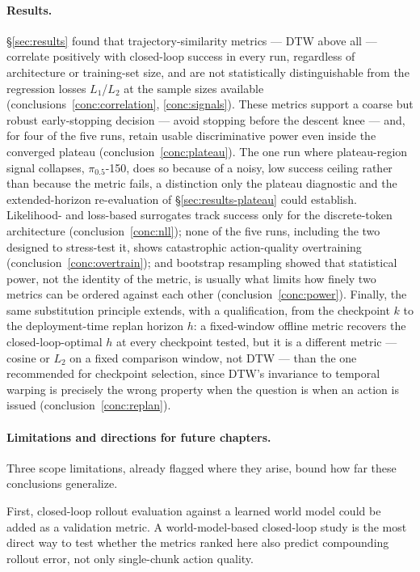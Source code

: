 \documentclass[english,12pt,a4paper,pdftex,elec,utf8]{aaltothesis}
\begin{document}
\paragraph{Results.} \S\ref{sec:results} found that trajectory-similarity metrics --- DTW above all --- correlate positively with closed-loop success in every run, regardless of architecture or training-set size, and are not statistically distinguishable from the regression losses $L_1$/$L_2$ at the sample sizes available (conclusions~\ref{conc:correlation}, \ref{conc:signals}). These metrics support a coarse
but robust early-stopping decision --- avoid stopping before the descent knee --- and, for four of the five runs, retain usable discriminative power even inside the converged plateau
(conclusion~\ref{conc:plateau}). The one run where plateau-region signal collapses, $\pi_{0.5}$-150, does so because of a noisy, low success ceiling rather than because the metric fails, a distinction only the plateau diagnostic and the extended-horizon re-evaluation of \S\ref{sec:results-plateau} could establish.
Likelihood- and loss-based surrogates track success only for the discrete-token architecture
(conclusion~\ref{conc:nll}); none of the five runs, including the two designed to stress-test it, shows catastrophic action-quality overtraining (conclusion~\ref{conc:overtrain}); and bootstrap resampling showed that statistical power, not the identity of the metric, is usually what limits how finely two metrics can be ordered against each other (conclusion~\ref{conc:power}). Finally, the same substitution principle extends, with a qualification, from the checkpoint $k$ to the deployment-time replan horizon $h$: a fixed-window offline metric recovers the closed-loop-optimal $h$ at every checkpoint tested, but it is a different metric --- cosine or $L_2$ on a fixed comparison window, not DTW --- than the one recommended for checkpoint selection, since DTW's invariance to temporal warping is precisely the wrong property when the question is when an action is issued (conclusion~\ref{conc:replan}).

\paragraph{Limitations and directions for future chapters.} Three scope limitations, already flagged where they arise, bound how far these conclusions generalize. 

First, closed-loop rollout evaluation against a learned world model could be added as a validation metric. A world-model-based closed-loop study is the most direct way to test whether the metrics ranked here also predict compounding rollout error, not only single-chunk action quality. 
\end{document}
